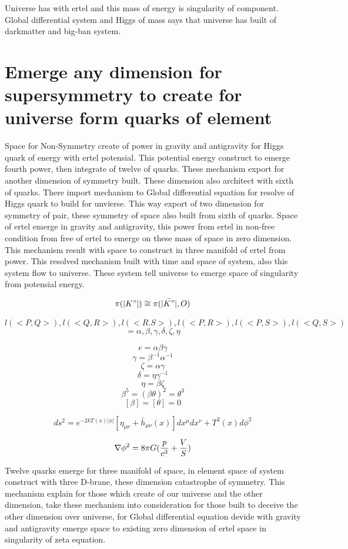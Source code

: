 \documentclass{jsarticle}
\begin{document}
  Universe has with ertel and this mass of energy is singularity of component. Global differential system
and Higgs of mass says that universe has built of darkmatter and big-ban system.

\section{Emerge any dimension for supersymmetry to create for universe form quarks of element}

  Space for Non-Symmetry create of power in gravity and antigravity for Higgs quark of energy with ertel potensial.
This potential energy construct to emerge fourth power, then integrate of twelve of quarks. These mechanism export
for another dimension of symmetry built. These dimension also  architect with sixth of quarks. There import
mechanism to Global differential equation for resolve of Higgs quark to build for unvierse. This way export of two
dimension for symmetry of pair, these symmetry of space also built from sixth of quarks. Space of ertel emerge in 
gravity and antigravity, this power from ertel in non-free condition from free of ertel to emerge on these mass
of space in zero dimension. This mechanism result with space to construct in three manifold of ertel from power.
This resolved mechanism  built with time and space of system, also this system flow to universe. These system
tell universe to emerge space of singularity from potensial energy.

$$ \pi(|K"|) \cong \pi(\bar{|K"|}, O) $$

$$ l(<P,Q>),l(<Q,R>),l(<R.S>),l(<P,R>),l(<P,S>),l(<Q,S>) $$
$$ = \alpha, \beta, \gamma,\delta,\zeta,\eta $$

$$ e = \alpha \beta \gamma $$
$$ \gamma = \beta^{-1} \alpha^{-1} $$
$$ \zeta = \alpha \gamma $$
$$ \delta = \eta \gamma^{-1} $$
$$ \eta = \beta \zeta $$
$$ \beta^5 = (\beta \theta)^2 = \theta^3 $$
$$ [\beta] = [\theta] =0 $$

  $$ ds^2 = e^{-2kT(x)|\phi|}[\eta_{\mu\nu} + \bar{h}_{\mu\nu}(x)]dx^{\mu}dx^{\nu} + T^2(x) d\phi^2 $$

  $$ \nabla \phi^2 = 8 \pi G({p \over c^3} + {V \over S}) $$


 Twelve quarks emerge for three manifold of space, in element space of system construct with three D-brane, 
these dimension catastrophe of symmetry. This mechanism explain for those which create of our universe and the
other dimension, take these mechanism into consideration for those built to deceive the other dimension
over universe, for Global differential equation devide with gravity and antigravity emerge space to existing
zero dimension of ertel space in singularity of zeta equation.
\end{document}
